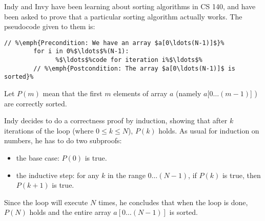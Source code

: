 \documentclass[12pt,letterpaper,boxed,cm]{hmcpset}
\begin{document}
\begin{solution}
    \vfill
\end{solution}
\newpage

\begin{problem}[4.]
    [10 points] Indy and Invy have been learning about sorting algorithms in CS 140, and have been asked to prove that a particular sorting algorithm actually works. The pseudocode given to them is:
    \begin{lstlisting}[escapechar=\%]
        // %\emph{Precondition: We have an array $a[0\ldots(N-1)]$}%
        for i in 0%$\ldots$%(N-1):
              %$\ldots$%code for iteration i%$\ldots$%
        // %\emph{Postcondition: The array $a[0\ldots(N-1)]$ is sorted}%
    \end{lstlisting}
    Let $P(m)$ mean that the first $m$ elements of array $a$ (namely $a[0\ldots(m-1)$] ) are correctly sorted.

    Indy decides to do a correctness proof by induction, showing that after $k$ iterations of the loop (where $0 \le k \le N$), $P(k)$ holds. As usual for induction on numbers, he has to do two subproofs:
    \begin{itemize}
        \item the base case: $P(0)$ is true.
        \item the inductive step: for any $k$ in the range $0\ldots(N-1)$, if $P(k)$ is true, then $P(k+1)$ is true.
    \end{itemize}
    Since the loop will execute $N$ times, he concludes that when the loop is done, $P(N)$ holds and the entire array $a[0\ldots(N-1)]$ is sorted.


\end{problem}
\end{document}
